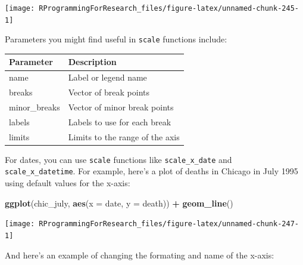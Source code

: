 \documentclass[]{book}
\makeatletter
\newenvironment{Shaded}{\begin{snugshade}}{\end{snugshade}}
\newcommand{\KeywordTok}[1]{\textcolor[rgb]{0.13,0.29,0.53}{\textbf{#1}}}
\newcommand{\DataTypeTok}[1]{\textcolor[rgb]{0.13,0.29,0.53}{#1}}
\newcommand{\StringTok}[1]{\textcolor[rgb]{0.31,0.60,0.02}{#1}}
\newcommand{\OperatorTok}[1]{\textcolor[rgb]{0.81,0.36,0.00}{\textbf{#1}}}
\newcommand{\NormalTok}[1]{#1}
\newenvironment{kframe}{%
\medskip{}
\setlength{\fboxsep}{.8em}
 \def\at@end@of@kframe{}%
 \ifinner\ifhmode%
  \def\at@end@of@kframe{\end{minipage}}%
  \begin{minipage}{\columnwidth}%
 \fi\fi%
 \def\FrameCommand##1{\hskip\@totalleftmargin \hskip-\fboxsep
 \colorbox{shadecolor}{##1}\hskip-\fboxsep
     \hskip-\linewidth \hskip-\@totalleftmargin \hskip\columnwidth}%
 \MakeFramed {\advance\hsize-\width
   \@totalleftmargin\z@ \linewidth\hsize
   \@setminipage}}%
 {\par\unskip\endMakeFramed%
 \at@end@of@kframe}
\renewenvironment{Shaded}{\begin{kframe}}{\end{kframe}}
\theoremstyle{definition}
\theoremstyle{definition}
\theoremstyle{definition}
\theoremstyle{remark}
\makeatother
\begin{document}
\begin{center}\texttt{[image: RProgrammingForResearch\_files/figure-latex/unnamed-chunk-245-1]} \end{center}

Parameters you might find useful in \texttt{scale} functions include:

\begin{tabular}{l|l}
\hline
Parameter & Description\\
\hline
name & Label or legend name\\
\hline
breaks & Vector of break points\\
\hline
minor\_breaks & Vector of minor break points\\
\hline
labels & Labels to use for each break\\
\hline
limits & Limits to the range of the axis\\
\hline
\end{tabular}

For dates, you can use \texttt{scale} functions like
\texttt{scale\_x\_date} and \texttt{scale\_x\_datetime}. For example,
here's a plot of deaths in Chicago in July 1995 using default values for
the x-axis:

\begin{Shaded}
\begin{Highlighting}[]
\KeywordTok{ggplot}\NormalTok{(chic_july, }\KeywordTok{aes}\NormalTok{(}\DataTypeTok{x =}\NormalTok{ date, }\DataTypeTok{y =}\NormalTok{ death)) }\OperatorTok{+}\StringTok{ }
\StringTok{  }\KeywordTok{geom_line}\NormalTok{() }
\end{Highlighting}
\end{Shaded}

\begin{center}\texttt{[image: RProgrammingForResearch\_files/figure-latex/unnamed-chunk-247-1]} \end{center}

And here's an example of changing the formating and name of the x-axis:

\begin{Shaded}
\end{Shaded}
\end{document}
